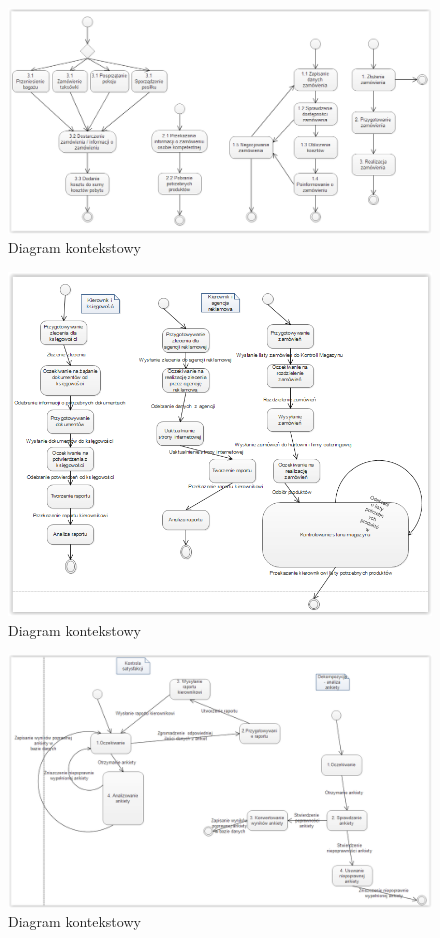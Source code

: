 \documentclass[a4paper, 11pt]{article}
\begin{document}
	\indent
	\begin{figure}[H]%
			\includegraphics[scale=0.8]{Img/STD-2-5.png}
			\caption{Diagram kontekstowy}
	\end{figure}
	
	\indent
	\begin{figure}[H]%
			\includegraphics[scale=0.8]{Img/STD-kierownik1.png}
			\caption{Diagram kontekstowy}
	\end{figure}
	
	\indent
	\begin{figure}[H]%
			\includegraphics[scale=0.8]{Img/STD-kierownik2.png}
			\caption{Diagram kontekstowy}
	\end{figure}
		
\end{document}
